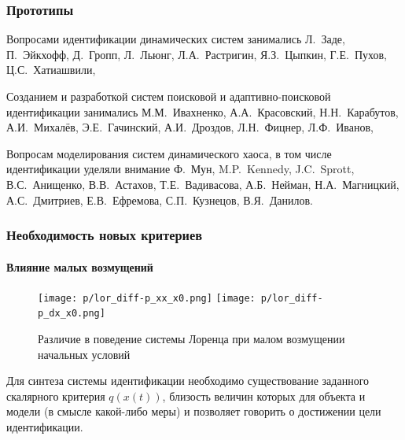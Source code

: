 \documentclass[10pt,utf8]{beamer}
\begin{document}

\begin{frame}
  \frametitle{Прототипы}

  Вопросами идентификации динамических систем занимались
  Л.~Заде,
  П.~Эйкхофф,
  Д.~Гропп,
  Л.~Льюнг,
  Л.А.~Растригин,
  Я.З.~Цыпкин,
  Г.Е.~Пухов,
  Ц.С.~Хатиашвили,


  Созданием и разработкой систем поисковой и адаптивно-поисковой идентификации занимались
  М.М.~Ивахненко,
  А.А.~Красовский,
  Н.Н.~Карабутов,
  А.И.~Михалёв,
  Э.Е.~Гачинский,
  А.И.~Дроздов,
  Л.Н.~Фицнер,
  Л.Ф.~Иванов,

  Вопросам моделирования систем динамического хаоса, в том числе идентификации уделяли внимание
Ф.~Мун,
M.P.~Kennedy,
J.C.~Sprott,
В.С.~Анищенко,
В.В.~Астахов,
Т.Е.~Вадивасова,
А.Б.~Нейман,
Н.А.~Магницкий,
А.С.~Дмитриев,
Е.В.~Ефремова,
С.П.~Кузнецов,
В.Я.~Данилов.







\end{frame}










\begin{frame}
  \frametitle{Необходимость новых критериев}
  \framesubtitle{Влияние малых возмущений}


  \begin{figure}[h!]
    \centerline{
      \texttt{[image: p/lor\_diff-p\_xx\_x0.png]}
      \hfill
      \texttt{[image: p/lor\_diff-p\_dx\_x0.png]}
    }
    \caption{Различие в поведение системы Лоренца при малом возмущении начальных условий}
    \label{atu:f:lor_diff_x0}
  \end{figure}

  \vspace{-5ex}

  Для синтеза системы идентификации необходимо существование
  заданного скалярного критерия $q(x(t))$, близость величин
  которых для объекта и модели (в смысле какой-либо меры)
  и позволяет говорить о достижении цели идентификации.

\end{frame}
\end{document}
